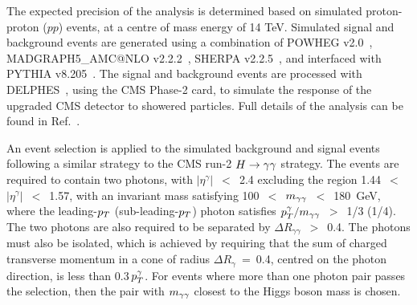 The expected precision of the analysis is determined based on simulated proton-proton ($pp$) events, at a centre of mass energy of 14 TeV.
Simulated signal and background events are generated using a combination of {\sc POWHEG}
v2.0~\cite{Alioli:2010xd,Nason:2009ai}, {\sc MADGRAPH5\_AMC@NLO} v2.2.2~\cite{Alwall:2014hca}, {\sc SHERPA} v2.2.5~\cite{Gleisberg:2008ta}, and interfaced with {\sc PYTHIA} v8.205~\cite{Sjostrand:2007gs}. The signal and background events are processed with {\sc DELPHES}~\cite{deFavereau2014}, using the CMS Phase-2 card, to simulate the response of the upgraded CMS detector to showered particles. Full details of the analysis can be found in Ref.~\cite{REF TO CMS PAS}.


An event selection is applied to the simulated background and signal events following a similar strategy to the CMS run-2 $H\rightarrow\gamma\gamma$ strategy. The events are required to contain two photons, with $|\eta^\gamma|$~$<$~2.4 excluding the region 1.44~$<$~$|\eta^\gamma|$~$<$~1.57, with an invariant mass satisfying 100~$<$~$m_{\gamma\gamma}$~$<$~180~GeV, where the leading-$p_{T}$ (sub-leading-$p_{T}$) photon satisfies $p_{T}^{\gamma}/m_{\gamma\gamma}$~$>$~1/3 (1/4). The two photons are also required to be separated by $\Delta R_{\gamma\gamma}$~$>$~0.4. The photons must also be isolated, which is achieved by requiring that the sum of charged transverse momentum in a cone of radius $\Delta R_{\gamma}$~=~0.4, centred on the photon direction, is less than 0.3$\, p_{T}^\gamma$. For events where more than one photon pair passes the selection, then the pair with $m_{\gamma\gamma}$ closest to the Higgs boson mass is chosen.

